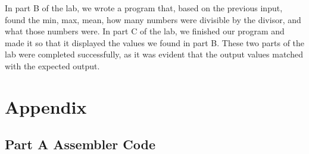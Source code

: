 \documentclass[10pt, letterpaper, titlepage]{article} %
\begin{document}
\begin{multicols*}{2}
In part B of the lab, we wrote a program that, based on the previous input, found the min, max, mean, how many numbers were divisible by the divisor, and what those numbers were. 
In part C of the lab, we finished our program and made it so that it displayed the values we found in part B. 
These two parts of the lab were completed successfully, as it was evident that the output values matched with the expected output. 

\end{multicols*}

\newpage

\section{Appendix}
\subsection{Part A Assembler Code}
\end{document}
